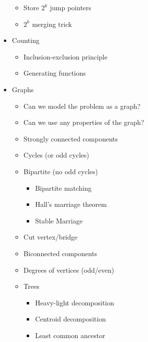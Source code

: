 \documentclass[9pt,a4paper,twocolumn,landscape,oneside]{amsart}
\begin{document}
\begin{itemize}
\begin{itemize}
                        \item Store $2^k$ jump pointers
                        \item $2^k$ merging trick
                    \end{itemize}
                \item Counting
                    \begin{itemize}
                        \item Inclusion-exclusion principle
                        \item Generating functions
                    \end{itemize}
                \item Graphs
                    \begin{itemize}
                        \item Can we model the problem as a graph?
                        \item Can we use any properties of the graph?
                        \item Strongly connected components
                        \item Cycles (or odd cycles)
                        \item Bipartite (no odd cycles)
                            \begin{itemize}
                                \item Bipartite matching
                                \item Hall's marriage theorem
                                \item Stable Marriage
                            \end{itemize}
                        \item Cut vertex/bridge
                        \item Biconnected components
                        \item Degrees of vertices (odd/even)
                        \item Trees
                            \begin{itemize}
                                \item Heavy-light decomposition
                                \item Centroid decomposition
                                \item Least common ancestor
                            \end{itemize}

\end{itemize}
\end{itemize}
\end{document}
